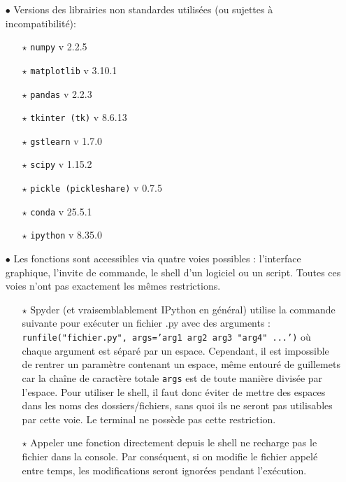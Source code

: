 \documentclass[12pt]{article}
\begin{document}
    \begin{enumerate}
        \item[$\bullet$] Versions des librairies non standardes utilisées (ou sujettes à incompatibilité):

        \begin{enumerate}
            \item[$\star$] \texttt{numpy} v 2.2.5
            \item[$\star$] \texttt{matplotlib} v 3.10.1
            \item[$\star$] \texttt{pandas} v 2.2.3
            \item[$\star$] \texttt{tkinter (tk)} v 8.6.13
            \item[$\star$] \texttt{gstlearn} v 1.7.0
            \item[$\star$] \texttt{scipy} v 1.15.2
            \item[$\star$] \texttt{pickle (pickleshare)} v 0.7.5
            \item[$\star$] \texttt{conda} v 25.5.1
            \item[$\star$] \texttt{ipython} v 8.35.0
        \end{enumerate}
    
        \item[$\bullet$] Les fonctions sont accessibles via quatre voies possibles : l'interface graphique, l'invite de commande, le shell d'un logiciel ou un script. Toutes ces voies n'ont pas exactement les mêmes restrictions.
        
        \begin{enumerate}
            \item[$\star$] Spyder (et vraisemblablement IPython en général) utilise la commande suivante pour exécuter un fichier .py avec des arguments : \texttt{runfile("fichier.py", args='arg1 arg2 arg3 "arg4" ...')} où chaque argument est séparé par un espace. Cependant, il est impossible de rentrer un paramètre contenant un espace, même entouré de guillemets car la chaîne de caractère totale \texttt{args} est de toute manière divisée par l'espace. Pour utiliser le shell, il faut donc éviter de mettre des espaces dans les noms des dossiers/fichiers, sans quoi ils ne seront pas utilisables par cette voie. Le terminal ne possède pas cette restriction.

            \item[$\star$] Appeler une fonction directement depuis le shell ne recharge pas le fichier dans la console. Par conséquent, si on modifie le fichier appelé entre temps, les modifications seront ignorées pendant l'exécution.
            

\end{enumerate}
\end{enumerate}
\end{document}
